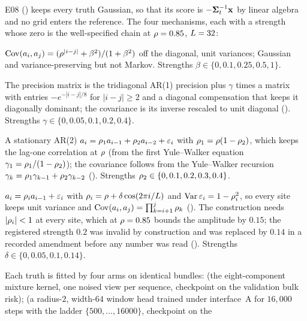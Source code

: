 E08 () keeps every truth Gaussian, so that its
score is $-\mathbf{\Sigma}_t^{-1}\mathbf{x}$ by linear algebra and no grid enters the reference. The four
mechanisms, each with a strength whose zero is the well-specified chain at
$\rho=0.85$, $L=32$:
\begin{description}[leftmargin=2em,itemsep=0.25em]
\item[\code{global}, rank-one latent $\beta$.] $\operatorname{Cov}(a_i,a_j)=(\rho^{|i-j|}+\beta^2)/(1+\beta^2)$
  off the diagonal, unit variances; Gaussian and variance-preserving but not Markov.
  Strengths $\beta\in\{0,0.1,0.25,0.5,1\}$.
\item[\code{longrange}, long-range precision coupling $\gamma$.] The precision matrix is
  the tridiagonal AR(1) precision plus $\gamma$ times a matrix with entries
  $-e^{-|i-j|/8}$ for $|i-j|\ge2$ and a diagonal compensation that keeps it diagonally
  dominant; the covariance is its inverse rescaled to unit diagonal
  (). Strengths $\gamma\in\{0,0.05,0.1,0.2,0.4\}$.
\item[\code{ar2}, a second autoregressive coefficient $\corr_2$.] A stationary AR(2)
  $a_i=\rho_1a_{i-1}+\rho_2a_{i-2}+\varepsilon_i$ with $\rho_1=\rho(1-\rho_2)$, which keeps
  the lag-one correlation at $\rho$ (from the first Yule--Walker equation
  $\gamma_1=\rho_1/(1-\rho_2)$); the covariance follows from the Yule--Walker
  recursion $\gamma_k=\rho_1\gamma_{k-1}+\rho_2\gamma_{k-2}$ ().
  Strengths $\rho_2\in\{0,0.1,0.2,0.3,0.4\}$.
\item[\code{sitevar}, site-dependent correlation $\delta$.] $a_i=\rho_ia_{i-1}+\varepsilon_i$
  with $\rho_i=\rho+\delta\cos(2\pi i/L)$ and $\operatorname{Var}\varepsilon_i=1-\rho_i^2$, so every
  site keeps unit variance and $\operatorname{Cov}(a_i,a_j)=\prod_{k=i+1}^{j}\rho_k$
  (). The construction needs $|\rho_i|<1$ at every site, which at
  $\rho=0.85$ bounds the amplitude by $0.15$; the registered strength $0.2$ was invalid
  by construction and was replaced by $0.14$ in a recorded amendment before any number
  was read (). Strengths $\delta\in\{0,0.05,0.1,0.14\}$.
\end{description}
Each truth is fitted by four arms on identical bundles:  (the
eight-component mixture kernel, one noised view per sequence, checkpoint on the
validation bulk risk);  (a radius-$2$, width-$64$ window head trained under
interface~A for $16{,}000$ steps with the ladder $\{500,\dots,16000\}$, checkpoint on the
